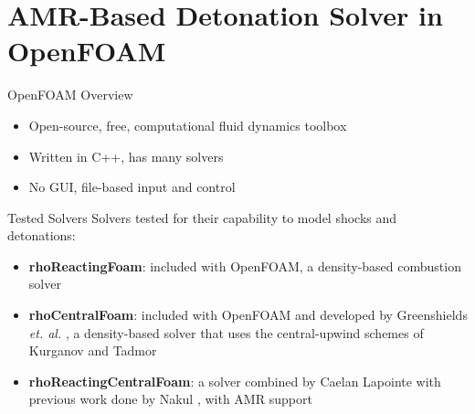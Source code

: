 \section{AMR-Based Detonation Solver in OpenFOAM}

\begin{frame}{OpenFOAM Overview}
\begin{itemize}
\item Open-source, free, computational fluid dynamics toolbox 
\item Written in C++, has many solvers 
\item No GUI, file-based input and control
\end{itemize}
\end{frame}

\begin{frame}{Tested Solvers}
Solvers tested for their capability to model shocks and detonations:
\begin{itemize}
\item \textbf{rhoReactingFoam}: included with OpenFOAM, a density-based combustion solver
\item \textbf{rhoCentralFoam}: included with OpenFOAM and developed by Greenshields \textit{et. al.} \cite{greenshields}, a density-based solver that uses the central-upwind schemes of Kurganov and Tadmor \cite{kurganov1} 
\item \textbf{rhoReactingCentralFoam}: a solver combined by Caelan Lapointe with previous work done by Nakul \cite{nakul}, with AMR support
\end{itemize}
\end{frame}

